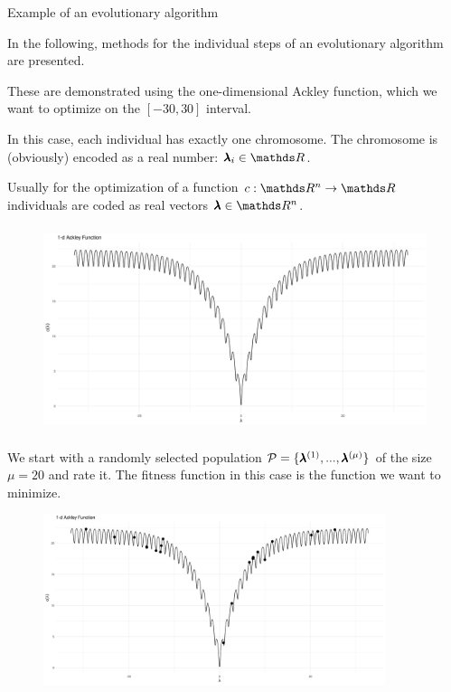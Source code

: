 \begin{frame}[allowframebreaks]{Example of an evolutionary algorithm}

In the following, methods for the individual steps of an evolutionary algorithm are presented.

\vspace{0.5cm}

These are demonstrated using the one-dimensional Ackley function, which we want to optimize on the $[-30, 30]$ interval.

\vspace{0.5cm}

In this case, each individual has exactly one chromosome. The chromosome is (obviously) encoded as a real number: $\xx_i \in \R$.

Usually for the optimization of a function $\f:\R^n \to \R$ individuals are coded as real vectors $\xx \in \R^n$.


\framebreak


\begin{center}
\begin{figure}
\includegraphics[width=\textwidth, height=6cm]{images/ea_ex1.png}
\end{figure}
\end{center}

\framebreak
We start with a randomly selected population $\mathcal{P} = \{\pmb{\lambda}^{(1)}, ..., \pmb{\lambda}^{(\mu)}\}$ of the size $\mu = 20$ and rate it. The fitness function in this case is the function we want to minimize.

\begin{center}
\begin{figure}
\includegraphics[width=\textwidth, height=5cm]{images/ea_ex2.png}
\end{figure}
\end{center}



\end{frame}

